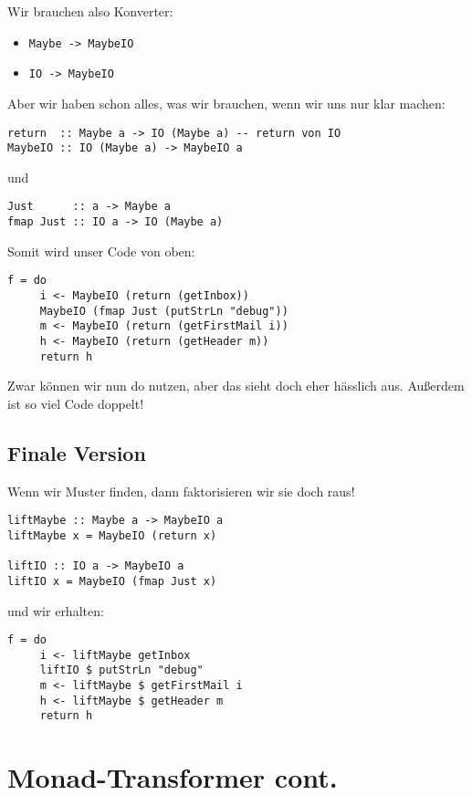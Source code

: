 \documentclass{beamer}
\begin{document}
\begin{frame}[fragile]
Wir brauchen also Konverter:
\begin{itemize}
 \item \texttt{Maybe -> MaybeIO}
 \item \texttt{IO -> MaybeIO}
\end{itemize}
\pause
Aber wir haben schon alles, was wir brauchen, wenn wir uns nur klar machen:
\begin{verbatim}
return  :: Maybe a -> IO (Maybe a) -- return von IO
MaybeIO :: IO (Maybe a) -> MaybeIO a
\end{verbatim}
\pause
und
\begin{verbatim}
Just      :: a -> Maybe a
fmap Just :: IO a -> IO (Maybe a)
\end{verbatim}
\end{frame}

\begin{frame}[fragile]
Somit wird unser Code von oben:
\begin{verbatim}
f = do
     i <- MaybeIO (return (getInbox))
     MaybeIO (fmap Just (putStrLn "debug"))
     m <- MaybeIO (return (getFirstMail i))
     h <- MaybeIO (return (getHeader m))
     return h
\end{verbatim}
\pause
Zwar können wir nun do nutzen, aber das sieht doch eher hässlich aus. Außerdem ist so viel Code doppelt!
\end{frame}

\subsection{Finale Version}

\begin{frame}[fragile]
Wenn wir Muster finden, dann faktorisieren wir sie doch raus!
\begin{verbatim}
liftMaybe :: Maybe a -> MaybeIO a
liftMaybe x = MaybeIO (return x)

liftIO :: IO a -> MaybeIO a
liftIO x = MaybeIO (fmap Just x)
\end{verbatim}
\pause
und wir erhalten:
\begin{verbatim}
f = do
     i <- liftMaybe getInbox
     liftIO $ putStrLn "debug"
     m <- liftMaybe $ getFirstMail i
     h <- liftMaybe $ getHeader m
     return h
\end{verbatim}
\end{frame}

\section{Monad-Transformer cont.}
\end{document}
